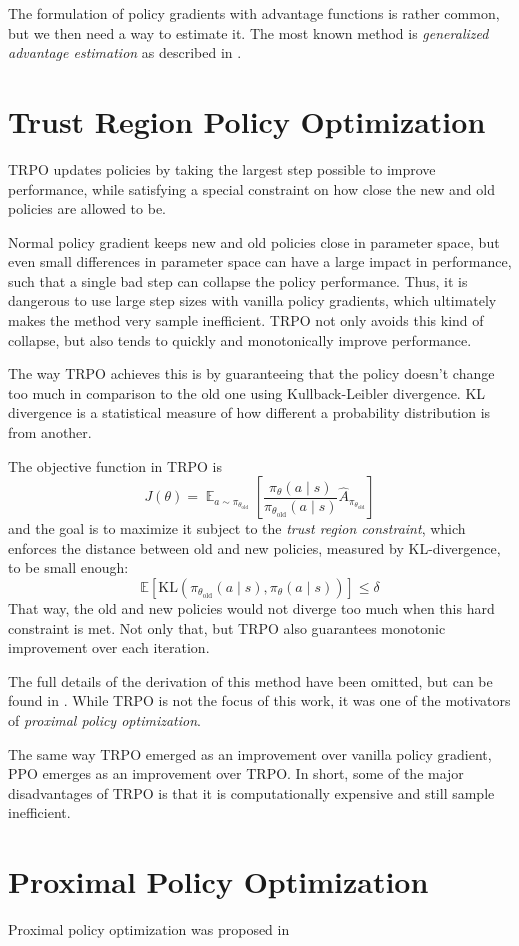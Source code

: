 The formulation of policy gradients with advantage functions is rather common, but we then need a way to estimate it. The most known method is \textit{generalized advantage estimation} as described in \cite{https://doi.org/10.48550/arxiv.1506.02438}.

\section{Trust Region Policy Optimization}
TRPO updates policies by taking the largest step possible to improve performance, while satisfying a special constraint on how close the new and old policies are allowed to be.

Normal policy gradient keeps new and old policies close in parameter space, but even small differences in parameter space can have a large impact in performance, such that a single bad step can collapse the policy performance. Thus, it is dangerous to use large step sizes with vanilla policy gradients, which ultimately makes the method very sample inefficient. TRPO not only avoids this kind of collapse, but also tends to quickly and monotonically improve performance.

The way TRPO achieves this is by guaranteeing that the policy doesn't change too much in comparison to the old one using Kullback-Leibler divergence. KL divergence is a statistical measure of how different a probability distribution is from another.

The objective function in TRPO is
\begin{equation}
    J(\theta) = \displaystyle\mathop{\mathbb{E}}_{a \sim \pi_{\theta_\text{old}}}\left[\frac{\pi_{\theta}(a \mid s)}{\pi_{\theta_\text{old}}(a \mid s)}\hat{A}_{\pi_{\theta_\text{old}}}\right]
\end{equation}
and the goal is to maximize it subject to the \textit{trust region constraint}, which enforces the distance between old and new policies, measured by KL-divergence, to be small enough:
\begin{equation}
    \mathbb{E}[\text{KL}(\pi_{\theta_\text{old}}(a \mid s), \pi_\theta(a \mid s))] \leq \delta
\end{equation}
That way, the old and new policies would not diverge too much when this hard constraint is met. Not only that, but TRPO also guarantees monotonic improvement over each iteration.

The full details of the derivation of this method have been omitted, but can be found in \cite{DBLP:journals/corr/SchulmanLMJA15}. While TRPO is not the focus of this work, it was one of the motivators of \textit{proximal policy optimization}.

The same way TRPO emerged as an improvement over vanilla policy gradient, PPO emerges as an improvement over TRPO. In short, some of the major disadvantages of TRPO is that it is computationally expensive and still sample inefficient.

\section{Proximal Policy Optimization}
Proximal policy optimization was proposed in \cite{schulman2017proximal}